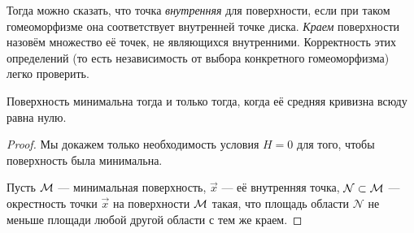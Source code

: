 Тогда можно сказать, что точка \textit{внутренняя} для поверхности, если при таком гомеоморфизме она соответствует внутренней точке диска. \textit{Краем} поверхности назовём множество её точек, не являющихся внутренними. Корректность этих определений (то есть независимость от выбора конкретного гомеоморфизма) легко проверить.

\begin{theorem}
	Поверхность минимальна тогда и только тогда, когда её средняя кривизна всюду равна нулю.
\end{theorem}

\begin{proof}
	Мы докажем только необходимость условия $H = 0$ для того, чтобы поверхность была минимальна.

	Пусть $\mathcal{M}$ --- минимальная поверхность, $\vec{x}$ --- её внутренняя точка, $\mathcal{N} \subset \mathcal{M}$ --- окрестность точки $\vec{x}$ на поверхности $\mathcal{M}$ такая, что площадь области $\mathcal{N}$ не меньше площади любой другой области с тем же краем.


\end{proof}
